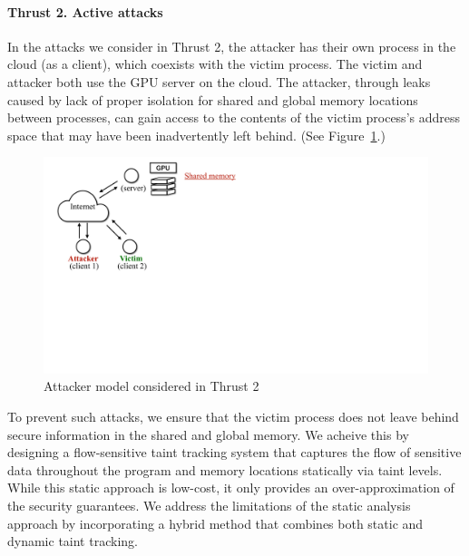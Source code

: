 \paragraph{Thrust 2. Active attacks}
In the attacks we consider in Thrust 2, the attacker has their own process in the cloud (as a client), which coexists with the victim process.
%
The victim and attacker both use the GPU server on the cloud.
%
The attacker, through leaks caused by lack of proper isolation for shared and  global memory locations between processes, can gain access to the contents of the victim process's address space that may have been inadvertently left behind.
%
(See Figure~\ref{fig:th2-attack}.)
\begin{figure}[h]
    \centering
    \includegraphics[clip,trim=0 17cm 10cm 0cm,width=0.72\pdfpagewidth]{figs/thrust2-fig.pdf}
    \caption{Attacker model considered in Thrust 2 }
    \label{fig:th2-attack}
\end{figure}

To prevent such attacks, we ensure that the victim process does not leave behind secure information in the shared and global memory. We acheive this by designing a flow-sensitive taint tracking system that captures the flow of sensitive data throughout the program and memory locations statically via taint levels.
%
While this static approach is low-cost, it only provides an over-approximation of the security guarantees. 
We address the limitations of the static analysis approach by incorporating a hybrid method that combines both static and dynamic taint tracking.

